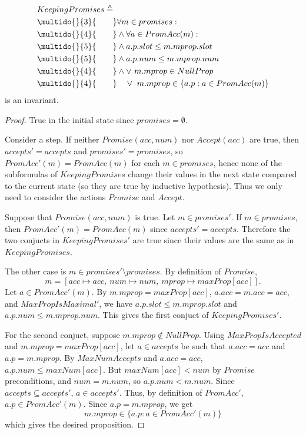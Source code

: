 \documentclass[12pt,a4paper,en]{pracamgr}
\newcommand{\ind}[1]{\multido{}{#1}{\qquad}}
\begin{document}
\begin{lemma}
    \begin{align*}
        & KeepingPromises \triangleq \\
        & \ind{3} \forall m \in promises:\\
        & \ind{4} \land \forall a \in PromAcc(m):\\
        & \ind{5} \land a.p.slot \le m.mprop.slot\\
        & \ind{5} \land a.p.num \le m.mprop.num\\
        & \ind{4} \land \lor\ m.mprop \in NullProp\\
        & \ind{4} \quad \lor\ m.mprop \in \{a.p: a \in PromAcc(m)\}
    \end{align*}
    is an invariant.
\end{lemma}
\begin{proof}
    True in the initial state since $promises = \emptyset$.

    Consider a step. If neither $Promise(acc, num)$ nor $Accept(acc)$ are true, then $accepts' = accepts$ and $promises' = promises$, so $PromAcc'(m) = PromAcc(m)$ for each $m \in promises$, hence none of the subformulas of $KeepingPromises$ change their values in the next state compared to the current state (so they are true by inductive hypothesis). Thus we only need to consider the actions $Promise$ and $Accept$.

    Suppose that $Promise(acc, num)$ is true. Let $m \in promises'$. If $m \in promises$, then $PromAcc'(m) = PromAcc(m)$ since $accepts' = accepts$. Therefore the two conjucts in $KeepingPromises'$ are true since their values are the same as in $KeepingPromises$.

    The other case is $m \in promises' \setminus promises$. By definition of $Promise$,
    $$m = [acc \mapsto acc,\ num \mapsto num,\ mprop \mapsto maxProp[acc]].$$
    Let $a \in PromAcc'(m)$. By $m.mprop = maxProp[acc]$, $a.acc = m.acc = acc$, and $MaxPropIsMaximal'$, we have $a.p.slot \le m.mprop.slot$ and $a.p.num \le m.mprop.num$. This gives the first conjuct of $KeepingPromises'$.

    For the second conjuct, suppose $m.mprop \notin NullProp$. Using $MaxPropIsAccepted$ and $m.mprop = maxProp[acc]$, let $a \in accepts$ be such that $a.acc = acc$ and $a.p = m.mprop$. By $MaxNumAccepts$ and $a.acc = acc$, $a.p.num \le maxNum[acc]$. But $maxNum[acc] < num$ by $Promise$ preconditions, and $num = m.num$, so $a.p.num < m.num$. Since $accepts \subseteq accepts'$, $a \in accepts'$. Thus, by definition of $PromAcc'$, $a.p \in PromAcc'(m)$. Since $a.p = m.mprop$, we get
    $$m.mprop \in \{a.p: a \in PromAcc'(m)\}$$
    which gives the desired proposition.


\end{proof}
\end{document}

